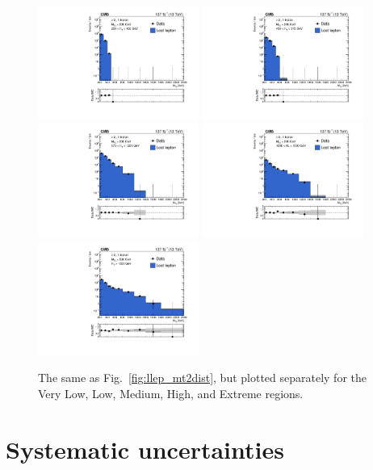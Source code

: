 \begin{figure}[t]
  \begin{center}
    \includegraphics[width=0.47\textwidth]{figs/llep/lostlepHybrid_incl_HT250to450_mt2bins.pdf}
    \includegraphics[width=0.47\textwidth]{figs/llep/lostlepHybrid_incl_HT450to575_mt2bins.pdf} \\
    \includegraphics[width=0.47\textwidth]{figs/llep/lostlepHybrid_incl_HT575to1200_mt2bins.pdf}
    \includegraphics[width=0.47\textwidth]{figs/llep/lostlepHybrid_incl_HT1200to1500_mt2bins.pdf} \\
    \includegraphics[width=0.47\textwidth]{figs/llep/lostlepHybrid_incl_HTge1500_mt2bins.pdf}
    \caption{The same as Fig.~\ref{fig:llep_mt2dist}, but plotted separately for the Very Low,
      Low, Medium, High, and Extreme \Ht regions.
            }
    \label{fig:llep_mt2dist_ht}
  \end{center}
\end{figure}


\section{Systematic uncertainties}
\label{sec:llep_syst}
